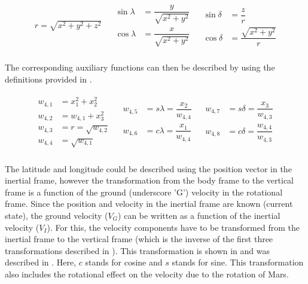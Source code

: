 \begin{align} \label{eq:transAngl}
\begin{split}
r = \sqrt{x^{2}+y^{2}+z^{2}}\\
\end{split}
&
\begin{split}
\sin \lambda &= \dfrac{y}{\sqrt{x^{2}+y^{2}}}\\
\cos \lambda &= \dfrac{x}{\sqrt{x^{2}+y^{2}}}\\
\end{split}
&
\begin{split}
\sin \delta &= \dfrac{z}{r}\\
\cos \delta &= \dfrac{\sqrt{x^{2}+y^{2}}}{r}
\end{split} 
\end{align} 

The corresponding auxiliary functions can then be described by  using the definitions provided in .

\begin{align} \label{eq:AuxFtransAngl}
\begin{split}
w_{4,1} &= x_{1}^{2}+x_{2}^{2} \\
w_{4,2} &= w_{4,1}+x_{3}^{2} \\
w_{4,3} &= r = \sqrt{w_{4,2}} \\
w_{4,4} &= \sqrt{w_{4,1}} \\
\end{split}
&
\begin{split}
w_{4,5} &= s\lambda = \dfrac{x_{2}}{w_{4,4}}\\
w_{4,6} &= c\lambda = \dfrac{x_{1}}{w_{4,4}} \\
\end{split}
&
\begin{split}
w_{4,7} &= s\delta = \dfrac{x_{3}}{w_{4,3}} \\
w_{4,8} &= c\delta = \dfrac{w_{4,4}}{w_{4,3}}\\
\end{split} 
\end{align} 


The latitude and longitude could be described using the position vector in the inertial frame, however the transformation from the body frame to the vertical frame is a function of the ground (underscore 'G') velocity in the rotational frame. Since the position and velocity in the inertial frame are known (current state), the ground velocity ($V_{G}$) can be written as a function of the inertial velocity ($V_{I}$). For this, the velocity components have to be transformed from the inertial frame to the vertical frame (which is the inverse of the first three transformations described in ). This transformation is shown in  and was described in \cite{mooij1994motion}. Here, $c$ stands for cosine and $s$ stands for sine. This transformation also includes the rotational effect on the velocity due to the rotation of Mars.
 
